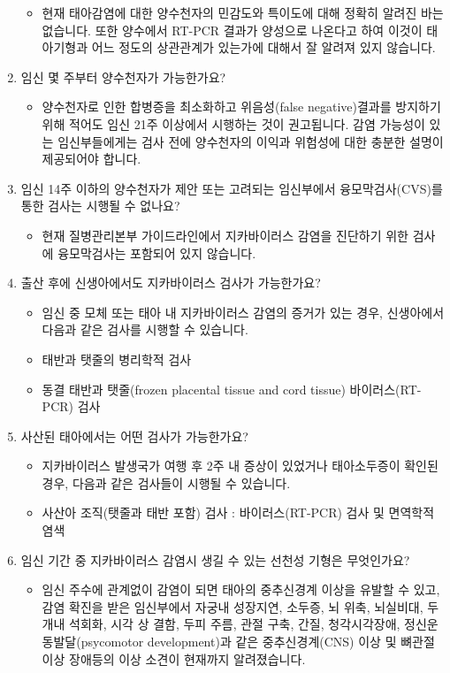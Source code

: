 \begin{enumerate}[1.]
\begin{itemize}[→]
	\item 현재 태아감염에 대한 양수천자의 민감도와 특이도에 대해 정확히 알려진 바는 없습니다. 또한 양수에서 RT-PCR 결과가 양성으로 나온다고 하여 이것이 태아기형과 어느 정도의 상관관계가 있는가에 대해서 잘 알려져 있지 않습니다. 
	\end{itemize}
\item 임신 몇 주부터 양수천자가 가능한가요?
	\begin{itemize}[→]\tightlist
	\item 양수천자로 인한 합병증을 최소화하고 위음성(false negative)결과를 방지하기 위해 적어도 임신 21주 이상에서 시행하는 것이 권고됩니다. 감염 가능성이 있는 임신부들에게는 검사 전에 양수천자의 이익과 위험성에 대한 충분한 설명이 제공되어야 합니다. 
	\end{itemize}
\item 임신 14주 이하의 양수천자가 제안 또는 고려되는 임신부에서 융모막검사(CVS)를 통한 검사는 시행될 수 없나요?
	\begin{itemize}[→]\tightlist
	\item 현재 질병관리본부 가이드라인에서 지카바이러스 감염을 진단하기 위한 검사에 융모막검사는 포함되어 있지 않습니다.
	\end{itemize}
\item 출산 후에 신생아에서도 지카바이러스 검사가 가능한가요?
	\begin{itemize}[→]\tightlist
	\item 임신 중 모체 또는 태아 내 지카바이러스 감염의 증거가 있는 경우, 신생아에서 다음과 같은 검사를 시행할 수 있습니다.
	\item 태반과 탯줄의 병리학적 검사
	\item 동결 태반과 탯줄(frozen placental tissue and cord tissue) 바이러스(RT-PCR) 검사
	\end{itemize}
\item 사산된 태아에서는 어떤 검사가 가능한가요?
	\begin{itemize}[→]\tightlist
	\item 지카바이러스 발생국가 여행 후 2주 내 증상이 있었거나 태아소두증이 확인된 경우, 다음과 같은 검사들이 시행될 수 있습니다.
	\item 사산아 조직(탯줄과 태반 포함) 검사 : 바이러스(RT-PCR) 검사 및 면역학적 염색  
	\end{itemize}
\item 임신 기간 중 지카바이러스 감염시 생길 수 있는 선천성 기형은 무엇인가요?
	\begin{itemize}[→]\tightlist
	\item 임신 주수에 관계없이 감염이 되면 태아의 중추신경계 이상을 유발할 수 있고, 감염 확진을 받은 임신부에서 자궁내 성장지연, 소두증, 뇌 위축, 뇌실비대, 두 개내 석회화, 시각 상 결함, 두피 주름, 관절 구축, 간질, 청각\cntrdot{}시각장애, 정신\cntrdot{}운동발달(psycomotor development)과 같은 중추신경계(CNS) 이상 및 뼈\cntrdot{}관절 이상 장애등의 이상 소견이 현재까지 알려졌습니다.

\end{itemize}
\end{enumerate}
